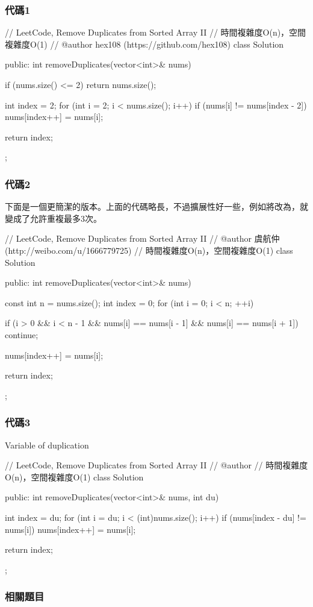 \subsubsection{代碼1}
\begin{Code}
// LeetCode, Remove Duplicates from Sorted Array II
// 時間複雜度O(n)，空間複雜度O(1)
// @author hex108 (https://github.com/hex108)
class Solution {
public:
    int removeDuplicates(vector<int>& nums) {
        if (nums.size() <= 2) return nums.size();

        int index = 2;
        for (int i = 2; i < nums.size(); i++){
            if (nums[i] != nums[index - 2])
                nums[index++] = nums[i];
        }

        return index;
    }
};
\end{Code}


\subsubsection{代碼2}
下面是一個更簡潔的版本。上面的代碼略長，不過擴展性好一些，例如將改為，就變成了允許重複最多3次。
\begin{Code}
// LeetCode, Remove Duplicates from Sorted Array II
// @author 虞航仲 (http://weibo.com/u/1666779725)
// 時間複雜度O(n)，空間複雜度O(1)
class Solution {
public:
    int removeDuplicates(vector<int>& nums) {
        const int n = nums.size();
        int index = 0;
        for (int i = 0; i < n; ++i) {
            if (i > 0 && i < n - 1 && nums[i] == nums[i - 1] && nums[i] == nums[i + 1])
                continue;

            nums[index++] = nums[i];
        }
        return index;
    }
};
\end{Code}


\subsubsection{代碼3}
Variable of duplication
\begin{Code}
// LeetCode, Remove Duplicates from Sorted Array II
// @author
// 時間複雜度O(n)，空間複雜度O(1)
class Solution {
public:
    int removeDuplicates(vector<int>& nums, int du) {
        int index = du;
        for (int i = du; i < (int)nums.size(); i++) {
            if (nums[index - du] != nums[i])
                nums[index++] = nums[i];
        }

        return index;
    }
};
\end{Code}
\subsubsection{相關題目}

